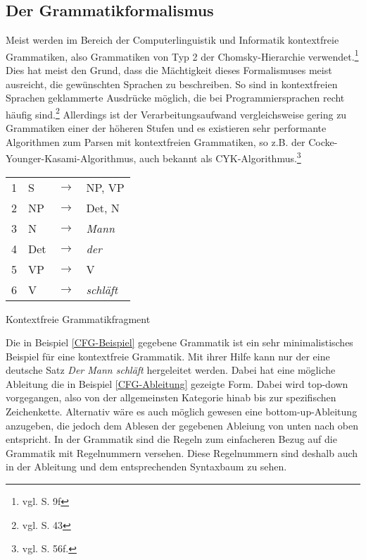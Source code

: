 \documentclass[12pt,abstract=on,titlepage,bibliography=totoc,ngerman,listof=totoc]{scrreprt}
\begin{document}
\subsection{Der Grammatikformalismus}
\label{subsec:grammatik}
Meist werden im Bereich der Computerlinguistik und Informatik kontextfreie Grammatiken, also Grammatiken von Typ 2 der Chomsky-Hierarchie verwendet.\footnote{vgl. \cite{SCHOENING2008} S. 9f} Dies hat meist den Grund, dass die Mächtigkeit dieses Formalismuses meist ausreicht, die gewünschten Sprachen zu beschreiben. So sind in kontextfreien Sprachen geklammerte Ausdrücke möglich, die bei Programmiersprachen recht häufig sind.\footnote{vgl. \cite{SCHOENING2008} S. 43} Allerdings ist der Verarbeitungsaufwand vergleichsweise gering zu Grammatiken einer der höheren Stufen und es existieren sehr performante Algorithmen zum Parsen mit kontextfreien Grammatiken, so z.B. der Cocke-Younger-Kasami-Algorithmus, auch bekannt als CYK-Algorithmus.\footnote{vgl. \cite{SCHOENING2008} S. 56f.}
\begin{program}[h]
\begin{tabular}{llll}
1 & S & $\longrightarrow$ & NP, VP \\
2 & NP & $\longrightarrow$ & Det, N \\
3 & N & $\longrightarrow$ & \textit{Mann} \\
4 & Det & $\longrightarrow$ & \textit{der} \\
5 & VP & $\longrightarrow$ & V \\
6 & V  & $\longrightarrow$ & \textit{schläft} \\
\end{tabular}
\caption{Kontextfreie Grammatikfragment}
\label{CFG-Beispiel}
\end{program}
Die in Beispiel \ref{CFG-Beispiel} gegebene Grammatik ist ein sehr minimalistisches Beispiel für eine kontextfreie Grammatik. Mit ihrer Hilfe kann nur der eine deutsche Satz \textit{Der Mann schläft} hergeleitet werden. Dabei hat eine mögliche Ableitung die in Beispiel \ref{CFG-Ableitung} gezeigte Form. Dabei wird top-down vorgegangen, also von der allgemeinsten Kategorie hinab bis zur spezifischen Zeichenkette. Alternativ wäre es auch möglich gewesen eine bottom-up-Ableitung anzugeben, die jedoch dem Ablesen der gegebenen Ableiung von unten nach oben entspricht. In der Grammatik sind die Regeln zum einfacheren Bezug auf die Grammatik mit Regelnummern versehen. Diese Regelnummern sind deshalb auch in der Ableitung und dem entsprechenden Syntaxbaum zu sehen. \par
\end{document}
